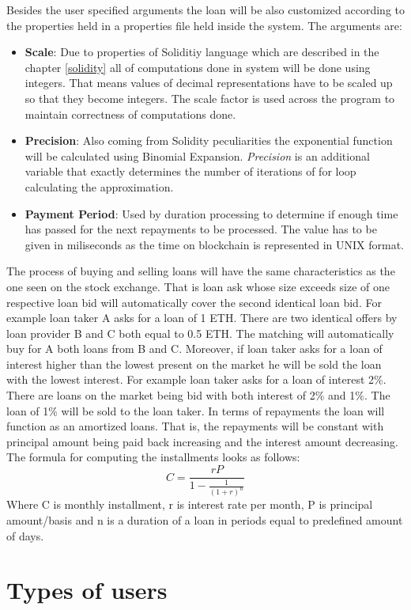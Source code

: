 \documentclass[a4paper,12pt,twoside,openany]{report}
\begin{document}
Besides the user specified arguments the loan will be also customized according to the properties held in a properties file held inside the system. The arguments are:
\begin{itemize}
\item \textbf{Scale}: Due to properties of Soliditiy language which are described in the chapter \ref{solidity} all of computations done in system will be done using integers. That means values of decimal representations have to be scaled up so that they become integers. The scale factor is used across the program to maintain correctness of computations done.
\item \textbf{Precision}: Also coming from Solidity peculiarities the exponential function will be calculated using Binomial Expansion. \textit{Precision} is an additional variable that exactly determines the number of iterations of for loop calculating the approximation.
\item \textbf{Payment Period}: Used by duration processing to determine if enough time has passed for the next repayments to be processed. The value has to be given in miliseconds as the time on blockchain is represented in UNIX format.
\end{itemize}

The process of buying and selling loans will have the same characteristics as the one seen on the stock exchange. That is loan ask whose size exceeds size of one respective loan bid will automatically cover the second identical loan bid. For example loan taker A asks for a loan of 1 ETH. There are two identical offers by loan provider B and C both equal to 0.5 ETH. The matching will automatically buy for A both loans from B and C. Moreover, if loan taker asks for a loan of interest higher than the lowest present on the market he will be sold the loan with the lowest interest. For example loan taker asks for a loan of interest 2\%. There are loans on the market being bid with both interest of 2\% and 1\%. The loan of 1\% will be sold to the loan taker. In terms of repayments the loan will function as an amortized loans. That is, the repayments will be constant with principal amount being paid back increasing and the interest amount decreasing. The formula for computing the installments looks as follows:
\[C = \frac{rP}{1 - \frac{1}{(1+r)^n}}\]
Where C is monthly installment, r is interest rate per month, P is principal amount/basis and n is a duration of a loan in periods equal to predefined amount of days.

\section{Types of users} \label{users}
\end{document}
